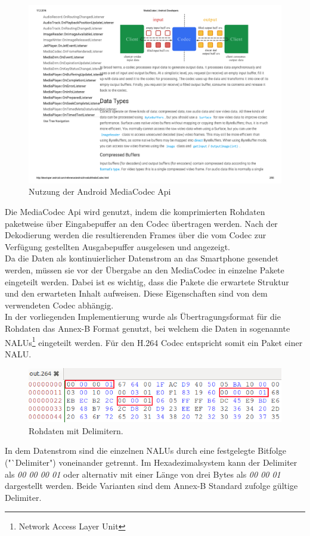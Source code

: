 \begin{figure}[h]
	\includegraphics{Bilder/BildakquiseUndDatenaufbereitung/mediacodec.pdf}
	\caption[Nutzung der Android MediaCodec Api]{Nutzung der Android MediaCodec Api\footnotemark}
	\label{fig:media_codec}
\end{figure}
Die MediaCodec Api wird genutzt, indem die komprimierten Rohdaten paketweise über Eingabepuffer an den Codec übertragen werden. Nach der Dekodierung werden die resultierenden Frames über die vom Codec zur Verfügung gestellten Ausgabepuffer ausgelesen und angezeigt.\\
Da die Daten als kontinuierlicher Datenstrom an das Smartphone gesendet werden, müssen sie vor der Übergabe an den MediaCodec in einzelne Pakete eingeteilt werden. Dabei ist es wichtig, dass die Pakete die erwartete Struktur und den erwarteten Inhalt aufweisen. Diese Eigenschaften sind von dem verwendeten Codec abhängig.\\
In der vorliegenden Implementierung wurde als Übertragungsformat für die Rohdaten das Annex-B Format genutzt, bei welchem die Daten in sogenannte NALUs\footnote{Network Access Layer Unit} eingeteilt werden. Für den H.264 Codec entspricht somit ein Paket einer NALU.\\
\begin{figure}[H]
	\includegraphics{Bilder/BildakquiseUndDatenaufbereitung/NALUs.png}
	\caption{Rohdaten mit Delimitern.}
	\label{fig:nalus_delimiter}
\end{figure}
In dem Datenstrom sind die einzelnen NALUs durch eine festgelegte Bitfolge ("`Delimiter") voneinander getrennt. Im Hexadezimalsystem kann der Delimiter als \textit{00 00 00 01} oder alternativ mit einer Länge von drei Bytes als \textit{00 00 01} dargestellt werden. Beide Varianten sind dem Annex-B Standard zufolge gültige Delimiter.\\

